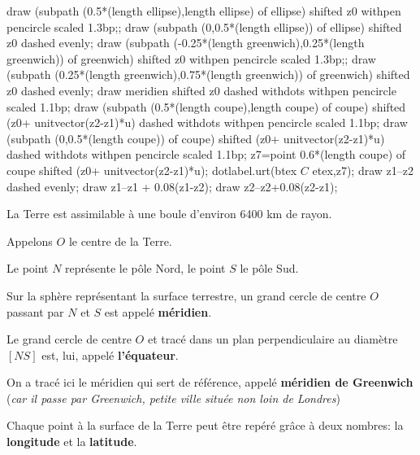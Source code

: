 \begin{changemargin}{-5mm}{-10mm}
\begin{definition}[Vocabulaire]
\begin{minipage}{0.35\linewidth}
\begin{center}
{\begin{Geometrie}
                    draw (subpath (0.5*(length ellipse),length ellipse) of ellipse) shifted z0 withpen pencircle scaled 1.3bp;;
                    draw (subpath (0,0.5*(length ellipse)) of ellipse) shifted z0 dashed evenly;
                    draw (subpath (-0.25*(length greenwich),0.25*(length greenwich)) of greenwich) shifted z0 withpen pencircle scaled 1.3bp;;
                    draw (subpath (0.25*(length greenwich),0.75*(length greenwich)) of greenwich) shifted z0 dashed evenly;                    
                    draw meridien shifted z0 dashed withdots withpen pencircle scaled 1.1bp;
                    draw (subpath (0.5*(length coupe),length coupe) of coupe) shifted (z0+ unitvector(z2-z1)*u) dashed withdots  withpen pencircle scaled 1.1bp;
                    draw (subpath (0,0.5*(length coupe)) of coupe) shifted (z0+ unitvector(z2-z1)*u) dashed withdots  withpen pencircle scaled 1.1bp;
                    z7=point 0.6*(length coupe) of coupe shifted (z0+ unitvector(z2-z1)*u);
                    dotlabel.urt(btex $C$ etex,z7);
                    draw z1--z2 dashed evenly;
                    draw z1--z1 + 0.08(z1-z2);
                    draw z2--z2+0.08(z2-z1);
                \end{Geometrie}
                }
        \end{center}
    \end{minipage}
    \hfill
    \begin{minipage}{0.65\linewidth}
        La Terre est assimilable à une boule d'environ 6400 km de rayon.

        Appelons $O$ le centre de la Terre.
        
        Le point $N$ représente le pôle Nord, le point $S$ le pôle Sud.

        Sur la sphère représentant la surface terrestre, un grand cercle de centre $O$ passant par $N$ et $S$ est appelé \textbf{méridien}.

        Le grand cercle de centre $O$ et tracé dans un plan perpendiculaire au diamètre $[NS]$ est, lui, appelé \textbf{l'équateur}.

        On a tracé ici le méridien qui sert de référence, appelé \textbf{méridien de Greenwich} (\textit{car il passe par Greenwich, petite ville située non loin de Londres})

        Chaque point à la surface de la Terre peut être repéré grâce à deux nombres: la \textbf{longitude} et la \textbf{latitude}.


\end{minipage}
\end{definition}
\end{changemargin}
